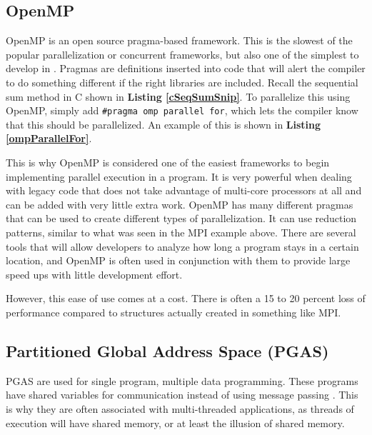 \documentclass[12pt]{article}
\newcommand{\code}[1]{\lstinline[]{#1}}
\newcommand{\codeRef}[1]{\textbf{Listing \ref{#1}}}
\begin{document}
\subsection{OpenMP}

OpenMP is an open source pragma-based framework. This is the slowest of the popular parallelization or concurrent frameworks, but also one of the simplest to develop in \cite{openmp_intro}. Pragmas are definitions inserted into code that will alert the compiler to do something different if the right libraries are included. Recall the sequential sum method in C shown in \codeRef{cSeqSumSnip}. To parallelize this using OpenMP, simply add \code{#pragma omp parallel for}, which lets the compiler know that this should be parallelized. An example of this is shown in \codeRef{ompParallelFor}.



This is why OpenMP is  considered one of the easiest frameworks to begin implementing parallel execution in a program. It is very powerful when dealing with legacy code that does not take advantage of multi-core processors at all and can be added with very little extra work. OpenMP has many different pragmas that can be used to create different types of parallelization. It can use reduction patterns, similar to what was seen in the MPI example above. There are several tools that will allow developers to analyze how long a program stays in a certain location, and OpenMP is often used in conjunction with them to provide large speed ups with little development effort.

However, this ease of use comes at a cost. There is often a 15 to 20 percent loss of performance compared to structures actually created in something like MPI. 

\subsection{Partitioned Global Address Space (PGAS)}
PGAS are used for single program, multiple data programming. These programs have shared variables for  communication instead of using message passing \cite{gpas_intro}. This is why they are often associated with multi-threaded applications, as threads of execution will have shared memory, or at least the illusion of shared memory.
\end{document}
